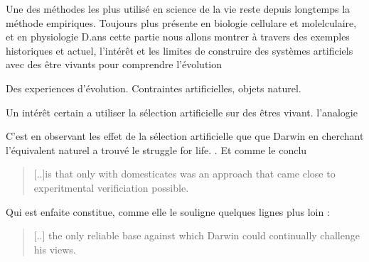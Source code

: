 Une des méthodes les plus utilisé en science de la vie reste depuis longtemps la méthode empiriques.
Toujours plus présente en biologie cellulare et molelculaire, et en physiologie
D.ans cette partie nous allons montrer à travers des exemples historiques et actuel, l'intérêt et les limites de construire des systèmes artificiels avec des être vivants pour comprendre l'évolution

Des experiences d'évolution. Contraintes artificielles, objets naturel.

Un intérêt certain a utiliser la sélection artificielle sur des êtres vivant.
\citet{waters86takinganalogicalinferenceseriouslydarwinsargumentartificialselection} l'analogie
\citet{evans84darwinsuseanalogybetweenartificialnaturalselection}


C'est en observant les effet de la sélection artificielle que que Darwin en cherchant l'équivalent naturel a trouvé le struggle for life. \cite[p. 126]{evans84darwinsuseanalogybetweenartificialnaturalselection}. Et comme le conclu \citet[p. 140]{evans84darwinsuseanalogybetweenartificialnaturalselection}

\begin{quote}
	[..]is that only with domesticates was an approach that came close to experitmental verificiation possible.  \end{quote}
	Qui est enfaite constitue, comme elle le souligne quelques lignes plus loin :
	\begin{quote}
		[..] the only reliable base against which Darwin could continually challenge his views.
	\end{quote}



